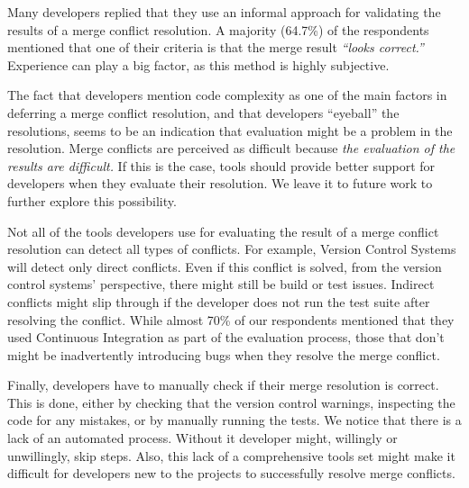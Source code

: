 Many developers replied that they use an informal approach for validating the results of a merge conflict resolution.
A majority (64.7\%) of the respondents mentioned that one of their criteria is that the merge result \emph{``looks correct.''}
Experience can play a big factor, as this method is highly subjective.

The fact that developers mention code complexity as one of the main factors in deferring a merge conflict resolution, and that developers ``eyeball'' the resolutions, seems to be an indication that evaluation might be a problem in the resolution.
Merge conflicts are perceived as difficult because \emph{the evaluation of the results are difficult.}
If this is the case, tools should provide better support for developers when they evaluate their resolution.
We leave it to future work to further explore this possibility. 

Not all of the tools developers use for evaluating the result of a merge conflict resolution can detect all types of conflicts.
For example, Version Control Systems will detect only direct conflicts.
Even if this conflict is solved, from the version control systems' perspective, there might still be build or test issues.
Indirect conflicts might slip through if the developer does not run the test suite after resolving the conflict.
While almost 70\% of our respondents mentioned that they used Continuous Integration as part of the evaluation process, those that don't might be inadvertently introducing bugs when they resolve the merge conflict.

Finally, developers have to manually check if their merge resolution is correct.
This is done, either by checking that the version control warnings, inspecting the code for any mistakes, or by manually running the tests.
We notice that there is a lack of an automated process.
Without it developer might, willingly or unwillingly, skip steps.
Also, this lack of a comprehensive tools set might make it difficult for developers new to the projects to successfully resolve merge conflicts.

